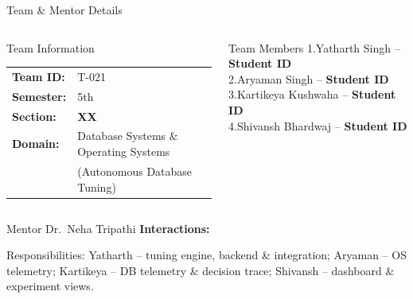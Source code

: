 \documentclass[aspectratio=169,11pt]{beamer}
\newcommand{\smallnote}[1]{%
\vspace{0.08cm}
{\scriptsize\color{GEUGrey}#1}
}
\newcommand{\fillme}[1]{\textbf{\color{red}#1}}
\begin{document}
\begin{frame}{Team \& Mentor Details}

\begin{columns}[T,totalwidth=\textwidth]


\begin{block}{Team Information}
\begin{tabular}{@{}ll@{}}
\textbf{Team ID:} & T-021\\
\textbf{Semester:} & 5th\\
\textbf{Section:} & \fillme{XX}\\
\textbf{Domain:} & Database Systems \& Operating Systems\\
 & (Autonomous Database Tuning)
\end{tabular}
\end{block}


\begin{block}{Team Members}
1.\quad Yatharth Singh -- \fillme{Student ID}\\
2.\quad Aryaman Singh -- \fillme{Student ID}\\
3.\quad Kartikeya Kushwaha -- \fillme{Student ID}\\
4.\quad Shivansh Bhardwaj -- \fillme{Student ID}
\end{block}

\end{columns}

\vspace{2mm}

\begin{block}{Mentor}
Dr.\ Neha Tripathi
\hfill
\textbf{Interactions:} \underline{\hspace{12mm}}
\end{block}

\vfill

\smallnote{
Responsibilities: Yatharth -- tuning engine, backend \& integration;
Aryaman -- OS telemetry; Kartikeya -- DB telemetry \& decision trace;
Shivansh -- dashboard \& experiment views.
}

\end{frame}
\end{document}
